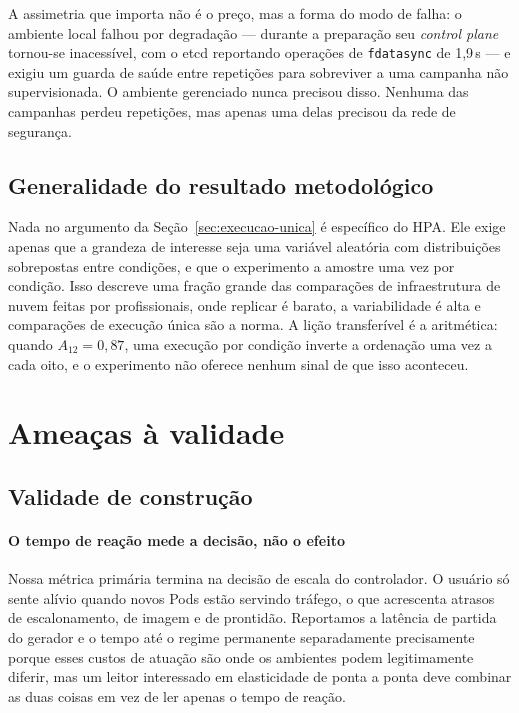 \documentclass[conference]{IEEEtran}
\begin{document}
A assimetria que importa não é o preço, mas a forma do modo de falha: o ambiente
local falhou por degradação --- durante a preparação seu \emph{control plane}
tornou-se inacessível, com o etcd reportando operações de \texttt{fdatasync} de
1,9\,s --- e exigiu um guarda de saúde entre repetições para sobreviver a uma
campanha não supervisionada. O ambiente gerenciado nunca precisou disso. Nenhuma
das campanhas perdeu repetições, mas apenas uma delas precisou da rede de
segurança.

\subsection{Generalidade do resultado metodológico}

Nada no argumento da Seção~\ref{sec:execucao-unica} é específico do HPA. Ele
exige apenas que a grandeza de interesse seja uma variável aleatória com
distribuições sobrepostas entre condições, e que o experimento a amostre uma vez
por condição. Isso descreve uma fração grande das comparações de infraestrutura
de nuvem feitas por profissionais, onde replicar é barato, a variabilidade é alta
e comparações de execução única são a norma. A lição transferível é a aritmética:
quando $A_{12}=0{,}87$, uma execução por condição inverte a ordenação uma vez a
cada oito, e o experimento não oferece nenhum sinal de que isso aconteceu.

\section{Ameaças à validade}
\label{sec:ameacas}

\subsection{Validade de construção}

\paragraph{O tempo de reação mede a decisão, não o efeito} Nossa métrica primária
termina na decisão de escala do controlador. O usuário só sente alívio quando
novos Pods estão servindo tráfego, o que acrescenta atrasos de escalonamento, de
imagem e de prontidão. Reportamos a latência de partida do gerador e o tempo até
o regime permanente separadamente precisamente porque esses custos de atuação são
onde os ambientes podem legitimamente diferir, mas um leitor interessado em
elasticidade de ponta a ponta deve combinar as duas coisas em vez de ler apenas o
tempo de reação.
\end{document}
